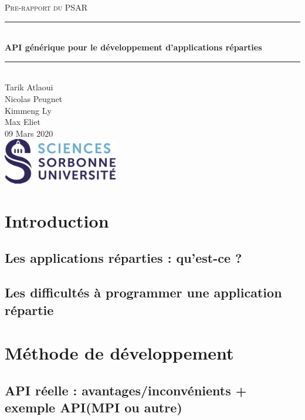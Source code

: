 \documentclass{article}
\date{\today}
\author{Tarik Atlaoui \\ Nicolas Peugnet \\ Kimmeng Ly \\ Max Eliet}
\begin{document}
\begin{titlepage}
	\enlargethispage{2cm}
	\newcommand{\HRule}{\rule{\linewidth}{0.5mm}}
	\center
	\textsc{\LARGE
	Pre-rapport du PSAR 
	} \\[1cm]
	\HRule \\[0.4cm]
	{ \huge \bfseries API générique pour le développement d'applications réparties \\[0.15cm] }
	\HRule \\[4cm]
	\large{Tarik Atlaoui \\[3mm] Nicolas Peugnet \\[3mm] Kimmeng Ly \\[3mm] Max Eliet} \\[3cm]
	09 Mars 2020 \\[3cm]
	\hfill \includegraphics[width=5cm]{logoSU.jpg}
\end{titlepage}

	\newpage
		\section{Introduction}
			\subsection{Les applications réparties : qu'est-ce ?}
			 \subsection{Les difficultés à programmer une application répartie}

		\section{Méthode de développement}
			\subsection{API réelle : avantages/inconvénients + exemple API(MPI ou autre)}
\end{document}
